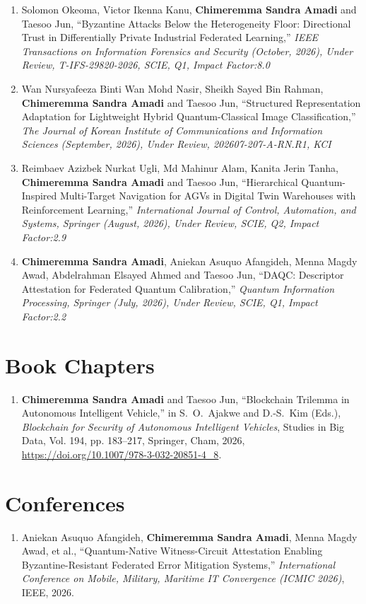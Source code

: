 \begin{titlepage}
\begin{enumerate}
\item Solomon Okeoma, Victor Ikenna Kanu, \textbf{Chimeremma Sandra Amadi} and Taesoo Jun, ``Byzantine Attacks Below the Heterogeneity Floor: Directional Trust in Differentially Private Industrial Federated Learning,'' \textit{IEEE Transactions on Information Forensics and Security (October, 2026), Under Review, T-IFS-29820-2026, SCIE, Q1, Impact Factor:8.0}

\item Wan Nursyafeeza Binti Wan Mohd Nasir, Sheikh Sayed Bin Rahman, \textbf{Chimeremma Sandra Amadi} and Taesoo Jun, ``Structured Representation Adaptation for Lightweight Hybrid Quantum-Classical Image Classification,'' \textit{The Journal of Korean Institute of Communications and Information Sciences (September, 2026), Under Review, 202607-207-A-RN.R1, KCI}

\item Reimbaev Azizbek Nurkat Ugli, Md Mahinur Alam, Kanita Jerin Tanha, \textbf{Chimeremma Sandra Amadi} and Taesoo Jun, ``Hierarchical Quantum-Inspired Multi-Target Navigation for AGVs in Digital Twin Warehouses with Reinforcement Learning,'' \textit{International Journal of Control, Automation, and Systems, Springer (August, 2026), Under Review, SCIE, Q2, Impact Factor:2.9}

\item \textbf{Chimeremma Sandra Amadi}, Aniekan Asuquo Afangideh, Menna Magdy Awad, Abdelrahman Elsayed Ahmed and Taesoo Jun, ``DAQC: Descriptor Attestation for Federated Quantum Calibration,'' \textit{Quantum Information Processing, Springer (July, 2026), Under Review, SCIE, Q1, Impact Factor:2.2}
\end{enumerate}

\section*{\Large Book Chapters}
\begin{enumerate}
\item \textbf{Chimeremma Sandra Amadi} and Taesoo Jun, ``Blockchain Trilemma in Autonomous Intelligent Vehicle,'' in S.~O.~Ajakwe and D.-S.~Kim (Eds.), \textit{Blockchain for Security of Autonomous Intelligent Vehicles}, Studies in Big Data, Vol. 194, pp. 183--217, Springer, Cham, 2026, \url{https://doi.org/10.1007/978-3-032-20851-4_8}.
\end{enumerate}

\section*{\Large Conferences}
\begin{enumerate}
\item Aniekan Asuquo Afangideh, \textbf{Chimeremma Sandra Amadi}, Menna Magdy Awad, et al., ``Quantum-Native Witness-Circuit Attestation Enabling Byzantine-Resistant Federated Error Mitigation Systems,'' \textit{International Conference on Mobile, Military, Maritime IT Convergence (ICMIC 2026)}, IEEE, 2026.


\end{enumerate}
\end{titlepage}

